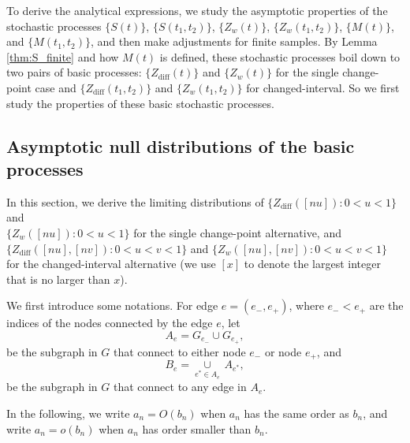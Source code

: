 \documentclass[arxiv, preprint]{imsart}
\numberwithin{equation}{section}
\theoremstyle{plain}
\begin{document}
To derive the analytical expressions, we study the asymptotic properties of the stochastic processes $\{S(t)\}$, $\{S(t_1,t_2)\}$, $\{Z_w(t)\}$, $\{Z_w(t_1,t_2)\}$, $\{M(t)\}$, and $\{M(t_1,t_2)\}$, and then make adjustments for finite samples. By Lemma \ref{thm:S_finite} and how $M(t)$ is defined, these stochastic processes boil down to two pairs of basic processes: $\{Z_\text{diff}(t)\}$ and $\{Z_w(t)\}$ for the single change-point case and $\{Z_\text{diff}(t_1,t_2)\}$ and $\{Z_w(t_1,t_2)\}$ for changed-interval. So we first study the properties of these basic stochastic processes. 

\subsection{Asymptotic null distributions of the basic processes}
\label{sec:4.1}

In this section, we derive the limiting distributions of $\{Z_\text{diff}([nu]):0 < u < 1\}$ and\\ $\{Z_w([nu]):0 < u < 1\}$ for the single change-point alternative, and \\$\{Z_\text{diff}([nu],[nv]):0 < u < v< 1\}$ and $\{Z_w([nu],[nv]):0 < u < v< 1\}$ for the changed-interval alternative (we use $[x]$ to denote the largest integer that is no larger than $x$).

We first introduce some notations. For edge $e = (e_{-},e_{+})$, where $e_{-} < e_{+}$ are the indices of the nodes connected by the edge $e$, let
\begin{equation} \label{eq:Ae}
A_e = G_{e_{-}} \cup G_{e_{+}},\end{equation}
be the subgraph in $G$ that connect to either node $e_{-}$ or node $e_{+}$, and 
\begin{equation} \label{eq:Be}
B_e = \underset{e^* \in A_e}{\cup} \, A_{e^*} , \end{equation}
be the subgraph in $G$ that connect to any edge in $A_e$. 

In the following, we write $a_n = O(b_n)$ when $a_n$ has the same order as $b_n$, and write $a_n = o(b_n)$ when $a_n$ has order smaller than $b_n$.

\end{document}
